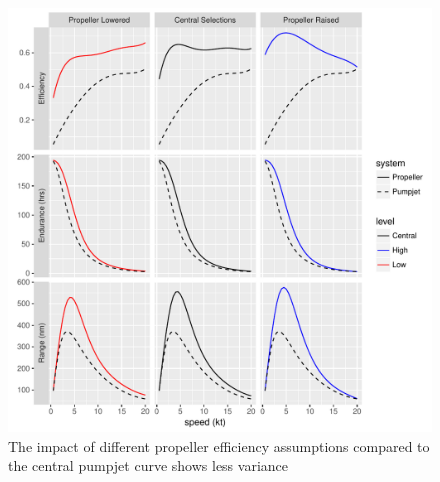 \documentclass{article}\usepackage[]{graphicx}\usepackage[]{color}
\makeatletter
\def\maxwidth{ %
  \ifdim\Gin@nat@width>\linewidth
    \linewidth
  \else
    \Gin@nat@width
  \fi
}
\newenvironment{knitrout}{}{} %
\makeatother
\begin{document}
\begin{figure}
\begin{knitrout}
\color{fgcolor}

{\centering \includegraphics[width=\maxwidth]{figures/plots-plot_results3-1} 

}



\end{knitrout}
\caption{The impact of different propeller efficiency assumptions compared to the central pumpjet curve shows less variance}
\label{fig:central_prop}
\end{figure}
\end{document}
